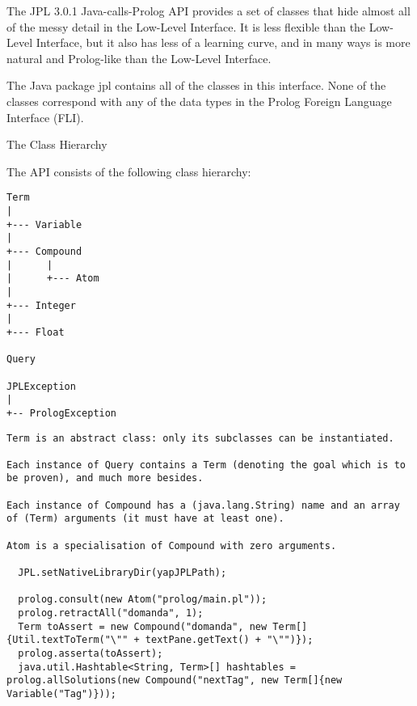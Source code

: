 The JPL 3.0.1 Java-calls-Prolog API provides a set of classes that hide almost all of the messy detail in the Low-Level Interface.  It is less flexible than the Low-Level Interface, but it also has less of a learning curve, and in many ways is more natural and Prolog-like than the Low-Level Interface.

The Java package jpl contains all of the classes in this interface.  None of the classes correspond with any of the data types in the Prolog Foreign Language Interface (FLI). 


The Class Hierarchy

The API consists of the following class hierarchy:
\begin{Verbatim}
Term
|
+--- Variable
|
+--- Compound
|      |
|      +--- Atom
|
+--- Integer
|
+--- Float

Query

JPLException
|
+-- PrologException
\end{Verbatim}
\begin{Verbatim}
Term is an abstract class: only its subclasses can be instantiated.

Each instance of Query contains a Term (denoting the goal which is to be proven), and much more besides.

Each instance of Compound has a (java.lang.String) name and an array of (Term) arguments (it must have at least one).

Atom is a specialisation of Compound with zero arguments. 

  JPL.setNativeLibraryDir(yapJPLPath);
  
  prolog.consult(new Atom("prolog/main.pl"));
  prolog.retractAll("domanda", 1);
  Term toAssert = new Compound("domanda", new Term[]{Util.textToTerm("\"" + textPane.getText() + "\"")});
  prolog.asserta(toAssert);
  java.util.Hashtable<String, Term>[] hashtables = prolog.allSolutions(new Compound("nextTag", new Term[]{new Variable("Tag")}));
  
  \end{Verbatim}
